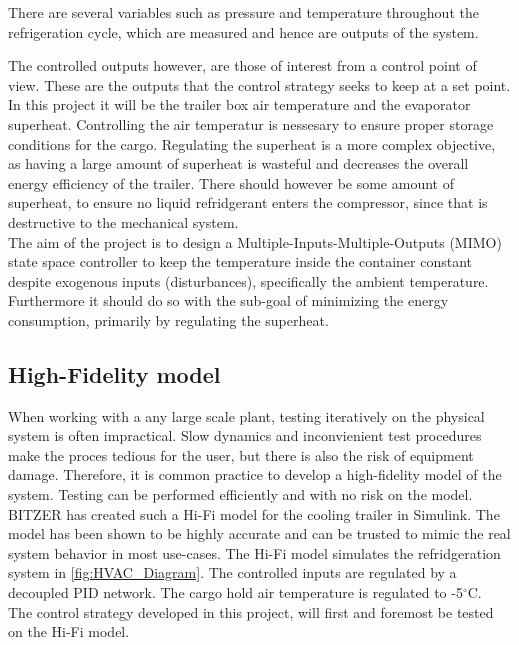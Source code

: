 There are several variables such as pressure and temperature throughout the refrigeration cycle, which are measured and hence are outputs of the system. 

The controlled outputs however, are those of interest from a control point of view. These are the outputs that the control strategy seeks to keep at a set point. In this project it will be the trailer box air temperature and the evaporator superheat. Controlling the air temperatur is nessesary to ensure proper storage conditions for the cargo. Regulating the superheat is a more complex objective, as having a large amount of superheat is wasteful and decreases the overall energy efficiency of the trailer. There should however be some amount of superheat, to ensure no liquid refridgerant enters the compressor, since that is destructive to the mechanical system.\\

The aim of the project is to design a Multiple-Inputs-Multiple-Outputs (MIMO) state space controller to keep the temperature inside the container constant despite exogenous inputs (disturbances), specifically the ambient temperature. Furthermore it should do so with the sub-goal of minimizing the energy consumption, primarily by regulating the superheat.

\subsection{High-Fidelity model}
When working with a any large scale plant, testing iteratively on the physical system is often impractical. Slow dynamics and inconvienient test procedures make the proces tedious for the user, but there is also the risk of equipment damage. Therefore, it is common practice to develop a high-fidelity model of the system. Testing can be performed efficiently and with no risk on the model. \\

BITZER has created such a Hi-Fi model for the cooling trailer in Simulink. The model has been shown to be highly accurate and can be trusted to mimic the real system behavior in most use-cases. The Hi-Fi model simulates the refridgeration system in \cref{fig:HVAC_Diagram}. The controlled inputs are regulated by a decoupled PID network. The cargo hold air temperature is regulated to -5$^{\circ}$C.\\

The control strategy developed in this project, will first and foremost be tested on the Hi-Fi model. 




